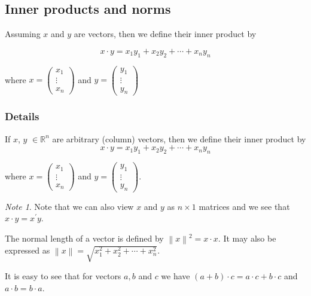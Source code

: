\documentclass[12pt,a4paper]{article}
\theoremstyle{regla}
\theoremstyle{remark}
\newtheorem{notes}{Note}[section]
\theoremstyle{definition}
\theoremstyle{nonumberbreak}
\begin{document}
\subsection{Inner products and norms}
\begin{fbox}
\begin{minipage}{0.97\textwidth}
Assuming $x$ and $y$ are vectors, then we define their inner product by 

$$x \cdot y = x_1y_1 + x_2y_2 + \cdots + x_ny_n$$

where $x =\begin{pmatrix}
x_1\\
\vdots\\
x_n
\end{pmatrix}$ and $y= \begin{pmatrix}
y_1\\
\vdots\\
y_n
\end{pmatrix}$ 


\end{minipage}
\end{fbox}
\subsubsection{Details}
If $x$, $y$ $\in \mathbb{R}^n$ are arbitrary (column) vectors, then we define their inner product by
$$x \cdot y = x_1y_1 + x_2y_2 + \cdots + x_ny_n$$

where $x= \begin{pmatrix}
x_1\\
\vdots\\
x_n
\end{pmatrix}$ and $y =\begin{pmatrix}
y_1\\
\vdots\\
y_n
\end{pmatrix}$.
\begin{notes}
Note that we can also view $x$ and $y$ as $n \times 1$ matrices and we see that $x \cdot y = x^\prime y$.  
\end{notes}
\begin{defn}
The normal length of a vector is defined by $\left \| x \right \|^2 = x \cdot x$.  It may also be expressed as $\left \| x \right \| = \sqrt{x_1^2 + x_2^2 + \cdots + x_n^2}$. 
\end{defn}
It is easy to see that for vectors $a, b$ and $c$ we have $(a+b)\cdot c=a\cdot c+ b\cdot c$ and $a\cdot b=b\cdot a$.
\end{document}
